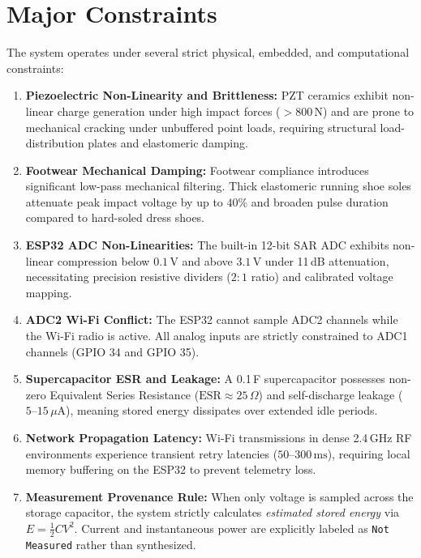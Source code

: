 \section{Major Constraints}
The system operates under several strict physical, embedded, and computational constraints:
\begin{enumerate}
    \item \textbf{Piezoelectric Non-Linearity and Brittleness:} PZT ceramics exhibit non-linear charge generation under high impact forces ($>800\,\text{N}$) and are prone to mechanical cracking under unbuffered point loads, requiring structural load-distribution plates and elastomeric damping.
    \item \textbf{Footwear Mechanical Damping:} Footwear compliance introduces significant low-pass mechanical filtering. Thick elastomeric running shoe soles attenuate peak impact voltage by up to $40\%$ and broaden pulse duration compared to hard-soled dress shoes.
    \item \textbf{ESP32 ADC Non-Linearities:} The built-in 12-bit SAR ADC exhibits non-linear compression below $0.1\,\text{V}$ and above $3.1\,\text{V}$ under 11\,dB attenuation, necessitating precision resistive dividers ($2:1$ ratio) and calibrated voltage mapping.
    \item \textbf{ADC2 Wi-Fi Conflict:} The ESP32 cannot sample ADC2 channels while the Wi-Fi radio is active. All analog inputs are strictly constrained to ADC1 channels (GPIO 34 and GPIO 35).
    \item \textbf{Supercapacitor ESR and Leakage:} A 0.1\,F supercapacitor possesses non-zero Equivalent Series Resistance ($\text{ESR} \approx 25\,\Omega$) and self-discharge leakage ($5\text{--}15\,\mu\text{A}$), meaning stored energy dissipates over extended idle periods.
    \item \textbf{Network Propagation Latency:} Wi-Fi transmissions in dense 2.4\,GHz RF environments experience transient retry latencies ($50\text{--}300\,\text{ms}$), requiring local memory buffering on the ESP32 to prevent telemetry loss.
    \item \textbf{Measurement Provenance Rule:} When only voltage is sampled across the storage capacitor, the system strictly calculates \textit{estimated stored energy} via $E = \frac{1}{2} C V^2$. Current and instantaneous power are explicitly labeled as \texttt{Not Measured} rather than synthesized.
\end{enumerate}


